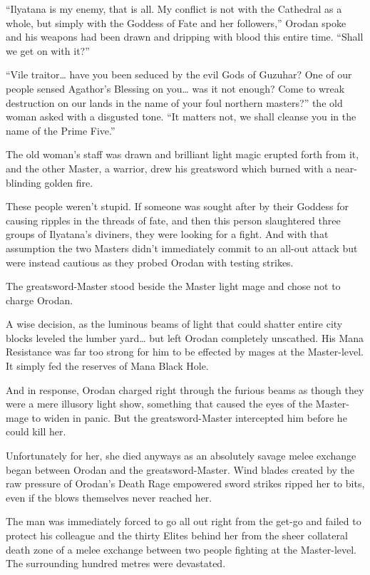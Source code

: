\documentclass[a4paper,10pt]{book}
\begin{document}
“Ilyatana is my enemy, that is all. My conflict is not with the Cathedral as a whole, but simply with the Goddess of Fate and her followers,” Orodan spoke and his weapons had been drawn and dripping with blood this entire time. “Shall we get on with it?”\par
“Vile traitor… have you been seduced by the evil Gods of Guzuhar? One of our people sensed Agathor’s Blessing on you… was it not enough? Come to wreak destruction on our lands in the name of your foul northern masters?” the old woman asked with a disgusted tone. “It matters not, we shall cleanse you in the name of the Prime Five.”\par
The old woman’s staff was drawn and brilliant light magic erupted forth from it, and the other Master, a warrior, drew his greatsword which burned with a near-blinding golden fire.\par
These people weren’t stupid. If someone was sought after by their Goddess for causing ripples in the threads of fate, and then this person slaughtered three groups of Ilyatana’s diviners, they were looking for a fight. And with that assumption the two Masters didn’t immediately commit to an all-out attack but were instead cautious as they probed Orodan with testing strikes.\par
The greatsword-Master stood beside the Master light mage and chose not to charge Orodan.\par
A wise decision, as the luminous beams of light that could shatter entire city blocks leveled the lumber yard… but left Orodan completely unscathed. His Mana Resistance was far too strong for him to be effected by mages at the Master-level. It simply fed the reserves of Mana Black Hole.\par
And in response, Orodan charged right through the furious beams as though they were a mere illusory light show, something that caused the eyes of the Master-mage to widen in panic. But the greatsword-Master intercepted him before he could kill her.\par
Unfortunately for her, she died anyways as an absolutely savage melee exchange began between Orodan and the greatsword-Master. Wind blades created by the raw pressure of Orodan’s Death Rage empowered sword strikes ripped her to bits, even if the blows themselves never reached her.\par
The man was immediately forced to go all out right from the get-go and failed to protect his colleague and the thirty Elites behind her from the sheer collateral death zone of a melee exchange between two people fighting at the Master-level. The surrounding hundred metres were devastated.\par
\end{document}
